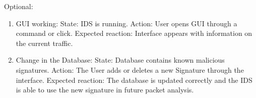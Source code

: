 \documentclass[oneside, english]{reports/assets/sdqtechreport}
\begin{document}
Optional:

\begin{enumerate}
	\item GUI working: 
 	      State: IDS is running. 
	      Action: User opens GUI through a command or click. 
              Expected reaction: Interface appears with information on the current traffic.
	\item Change in the Database: 
 	      State: Database contains known malicious signatures.
	      Action: The User adds or deletes a new Signature through the interface.
	      Expected reaction: The database is updated correctly and the IDS is able to use
	      the new signature in future packet analysis.
\end{enumerate}
\end{document}
